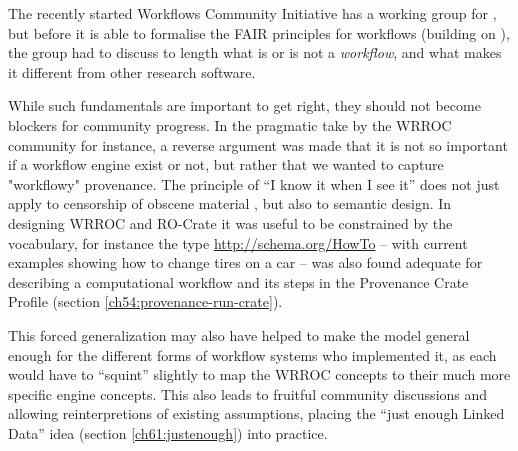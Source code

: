 The recently started Workflows Community Initiative has a working group for , but before it is able to formalise the FAIR principles for workflows (building on \cite{Goble 2020}), the group had to discuss to length what is or is not a \emph{workflow}, and what makes it different from other research software.

While such fundamentals are important to get right, they should not become blockers for community progress. In the pragmatic take by the WRROC community for instance, a reverse argument was made that it is not so important if a workflow engine exist or not, but rather that we wanted to capture "workflowy" provenance. The principle of ``I know it when I see it'' does not just apply to censorship of obscene material \cite{Gewirtz 1996}, but also to semantic design. In designing WRROC and RO-Crate it was useful to be constrained by the \cite{schema.org} vocabulary, for instance the type \url{http://schema.org/HowTo} -- with current examples showing how to change tires on a car -- was also found adequate for describing a computational workflow and its steps in the Provenance Crate Profile (section \vref{ch54:provenance-run-crate}). 

This forced generalization may also have helped to make the model general enough for the different forms of workflow systems who implemented it, as each would have to ``squint'' slightly to map the WRROC concepts to their much more specific engine concepts. This also leads to fruitful community discussions and allowing reinterpretions of existing assumptions, placing the ``just enough Linked Data'' idea (section \vref{ch61:justenough}) into practice.
